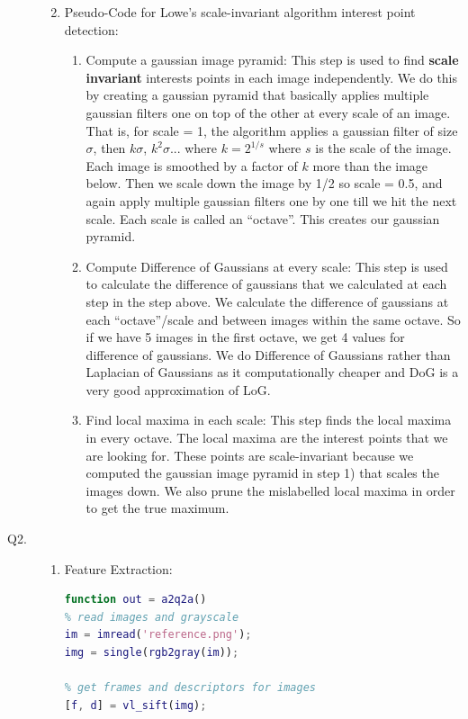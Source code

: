 \documentclass{csc_assignment4}
\begin{document}
\begin{description}
\begin{enumerate}[label=(\alph*)]
\newpage
\item   
Pseudo-Code for Lowe's scale-invariant algorithm interest point detection: \begin{enumerate}
\item Compute a gaussian image pyramid: This step is used to find \textbf{scale invariant} interests points in each image independently. We do this by creating a gaussian pyramid that basically applies multiple gaussian filters one on top of the other at every scale of an image. That is, for scale = 1, the algorithm applies a gaussian filter of size $\sigma$, then $k\sigma$, $k^{2}\sigma$... where $k = 2^{1/s}$ where $s$ is the scale of the image. Each image is smoothed by a factor of $k$ more than the image below. Then we scale down the image by 1/2 so scale = 0.5, and again apply multiple gaussian filters one by one till we hit the next scale. Each scale is called an ``octave''. This creates our gaussian pyramid.
\item Compute Difference of Gaussians at every scale: This step is used to calculate the difference of gaussians that we calculated at each step in the step above. We calculate the difference of gaussians at each ``octave''/scale and between images within the same octave. So if we have 5 images in the first octave, we get 4 values for difference of gaussians. We do Difference of Gaussians rather than Laplacian of Gaussians as it computationally cheaper and DoG is a very good approximation of LoG.
\item Find local maxima in each scale: This step finds the local maxima in every octave. The local maxima are the interest points that we are looking for. These points are scale-invariant because we computed the gaussian image pyramid in step 1) that scales the images down. We also prune the mislabelled local maxima in order to get the true maximum. 
\end{enumerate}
\end{enumerate}

\item[Q2.]
\begin{enumerate}[label=(\alph*)]
\item Feature Extraction: 
\begin{lstlisting}[language=MATLAB]
% SIFT features for reference.png, test.png and test2.png
function out = a2q2a()
% read images and grayscale
im = imread('reference.png');
img = single(rgb2gray(im));

% get frames and descriptors for images
[f, d] = vl_sift(img);


\end{lstlisting}
\end{enumerate}
\end{description}
\end{document}
